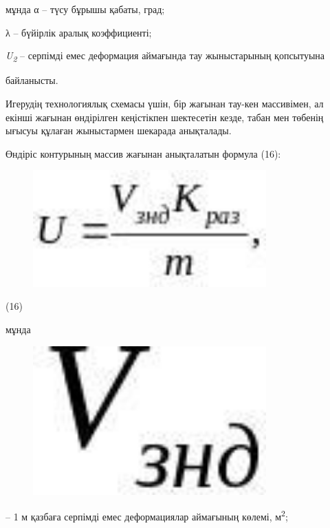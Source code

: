 мұнда α -- түсу бұрышы қабаты, град;

λ -- бүйірлік аралық коэффициенті;

\emph{U\textsubscript{2}} -- серпімді емес деформация аймағында тау
жыныстарының қопсытуына

байланысты.

Игерудің технологиялық схемасы үшін, бір жағынан тау-кен массивімен, ал
екінші жағынан өндірілген кеңістікпен шектесетін кезде, табан мен
төбенің ығысуы құлаған жыныстармен шекарада анықталады.

Өндіріс контурының массив жағынан анықталатын формула (16):

\begin{figure}[H]
	\centering
	\includegraphics[width=0.8\textwidth]{assets/1312}
	\caption*{}
\end{figure} (16)

мұнда \begin{figure}[H]
	\centering
	\includegraphics[width=0.8\textwidth]{assets/1313}
	\caption*{}
\end{figure} -- 1 м қазбаға серпімді емес
деформациялар аймағының көлемі, м\textsuperscript{2};

